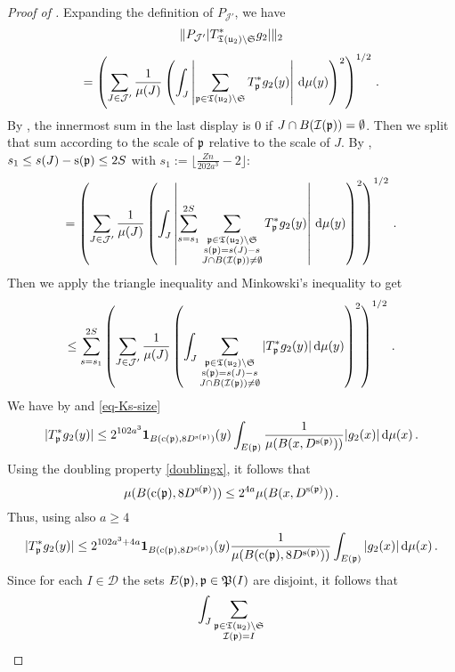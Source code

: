 \begin{proof}[Proof of ]
    \leanok
    Expanding the definition of $P_{\mathcal{J}'}$, we have
    $$
        \|P_{\mathcal{J}'}|T_{{\mathfrak T}({\mathfrak u}_2) \setminus \mathfrak{S}}^* g_2|\|_2
    $$
    $$
        = \left(\sum_{J \in \mathcal{J}'} \frac{1}{\mu(J)} \left(\int_J \left| \sum_{{\mathfrak p} \in {\mathfrak T}({\mathfrak u}_2) \setminus \mathfrak{S}} T_{{\mathfrak p}}^* g_2(y) \right| \, \mathrm{d}\mu(y) \right)^2 \right)^{1/2}\,.
    $$
    By , the innermost sum in the last display is $0$ if $J \cap B({\mathcal{I}}({\mathfrak p})) = \emptyset$.
    Then we split that sum according to the scale of ${\mathfrak p}$ relative to the scale of $J$.
    By , $s_1 \le s(J) - {\mathrm{s}}({\mathfrak p}) \le 2S$ with $s_1 := \lfloor\frac{Zn}{202a^3} - 2\rfloor$:
    $$
        = \left(\sum_{J \in \mathcal{J}'} \frac{1}{\mu(J)} \left(\int_J \left| \sum_{s=s_1}^{2S} \sum_{\substack{{\mathfrak p} \in {\mathfrak T}({\mathfrak u}_2) \setminus \mathfrak{S}\\ {\mathrm{s}}({\mathfrak p}) = s(J) - s\\
        J \cap B({\mathcal{I}}({\mathfrak p})) \ne \emptyset}} T_{{\mathfrak p}}^* g_2(y) \right| \, \mathrm{d}\mu(y) \right)^2 \right)^{1/2}\,.
    $$
    Then we apply the triangle inequality and Minkowski's inequality to get
    \begin{equation}
    \label{eq-sep-tree-small-1}
        \le \sum_{s=s_1}^{2S} \left( \sum_{J \in \mathcal{J}'} \frac{1}{\mu(J)} \left(\int_J \sum_{\substack{{\mathfrak p} \in {\mathfrak T}({\mathfrak u}_2) \setminus \mathfrak{S}\\ {\mathrm{s}}({\mathfrak p}) = s(J) - s\\
        J \cap B({\mathcal{I}}({\mathfrak p})) \ne \emptyset}} |T_{{\mathfrak p}}^* g_2(y)| \, \mathrm{d}\mu(y) \right)^2\right)^{1/2}\,.
    \end{equation}
    We have by  and \eqref{eq-Ks-size}
    $$
        |T_{{\mathfrak p}}^* g_2(y)| \le 2^{102a^3} \mathbf{1}_{B({\mathrm{c}}({\mathfrak p}), 8D^{{\mathrm{s}}({\mathfrak p})})}(y) \int_{E({\mathfrak p})} \frac{1}{\mu(B(x, D^{{\mathrm{s}}({\mathfrak p})}))} |g_2(x)| \, \mathrm{d}\mu(x)\,.
    $$
    Using the doubling property \eqref{doublingx}, it follows that
    $$
        \mu(B({\mathrm{c}}({\mathfrak p}), 8D^{{\mathrm{s}}({\mathfrak p})})) \le 2^{4a} \mu(B(x, D^{{\mathrm{s}}({\mathfrak p})}))\,.
    $$
    Thus, using also $a \ge 4$
    $$
        |T_{{\mathfrak p}}^* g_2(y)| \le 2^{102a^3+4a} \mathbf{1}_{B({\mathrm{c}}({\mathfrak p}), 8D^{{\mathrm{s}}({\mathfrak p})})}(y) \frac{1}{\mu(B({\mathrm{c}}({\mathfrak p}), 8D^{{\mathrm{s}}({\mathfrak p})}))} \int_{E({\mathfrak p})} |g_2(x)| \, \mathrm{d}\mu(x)\,.
    $$
    Since for each $I \in \mathcal{D}$ the sets $E({\mathfrak p}), {\mathfrak p} \in {\mathfrak P}(I)$ are disjoint, it follows that
    $$
        \int_J \sum_{\substack{{\mathfrak p} \in {\mathfrak T}({\mathfrak u}_2) \setminus \mathfrak{S}\\ {\mathcal{I}}({\mathfrak p}) = I\\
}}$$
\end{proof}
